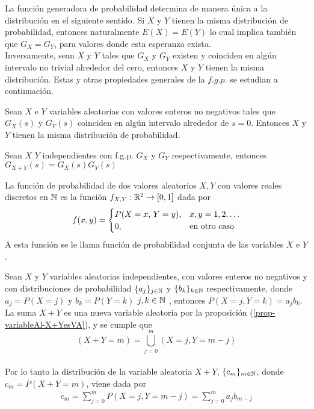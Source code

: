 La función generadora de probabilidad determina de manera única a la distribución en el siguiente sentido. Si $X$ y $Y$ tienen la misma distribución de probabilidad, entonces naturalmente $E(X)=E(Y)$ lo cual implica también que $G_X=G_Y$, para valores donde esta esperanza exista.\\
Inversamente, sean $X$ y $Y$ tales que $G_X$ y
$G_Y$ existen y coinciden en algún intervalo no trivial alrededor del cero,
entonces $X$ y $Y$ tienen la misma distribución. Estas y otras propiedades
generales de la $f.g.p.$ se estudian a continuación.
\begin{Prop}
    Sean $X$ e $Y$ variables aleatorias con valores enteros no negativos tales que $G_X(s)$ y $G_Y(s)$ coinciden en algún intervalo alrededor de $s=0$. Entonces $X$ y $Y$ tienen la misma distribución de probabilidad. \label{prop-funcionGenIgual-distribucuionIgual}
\end{Prop}
\begin{Prop}
    Sean $X$  $Y$ independientes con f.g.p. $G_X$ y $G_Y$ respectivamente, entonces $G_{X+Y}(s)=G_X(s)G_Y(s)$
    \label{prop-funcionGenSuma-productoFuncionGen}
\end{Prop}
\begin{Def} 
    La función de probabilidad de dos valores aleatorios $X, Y$ con valores reales discretos en ${\mathbb{N}}$ es la función $f_{X,Y} :{\mathbb{R}}^2 \rightarrow [0, 1]$ dada por
    $$f(x,y)=
    \begin{cases}
        P(X=x,\thinspace Y=y), & \mbox{$x,y=1,2,\ldots$}\\
        0,& \mbox{en otro caso}
    \end{cases}$$
    A esta función se le llama función de probabilidad conjunta de las variables $X$ e $Y$.
\end{Def}
Sean $X$ y $Y$ variables aleatorias independientes, con valores enteros no negativos y con distribuciones de probabilidad $\{a_j\}_{j\in{\mathbb{N}}}$ y $\{b_k\}_{k\in{\mathbb{N}}}$ respectivamente, donde $a_j=P(X=j)$ y  $b_k=P(Y=k)$ $j,k\in{\mathbb{N}}$ , entonces $P(X=j,Y=k)=a_j b_k$.\\ La suma $X+Y$ es una nueva variable aleatoria por la proposición (\ref{prop-variableAl-X+YesVA}), y se cumple que $$(X+Y=m)=\bigcup_{j=0}^{m}(X=j,Y=m-j)$$ \\ Por lo tanto la distribución de la variable aleatoria $X+Y$, $\{c_m\}_{m\in{\mathbb{N}}}$, donde $c_m=P(X+Y=m)$, viene dada por
\begin{eqnarray}
    c_m=\sum_{j=0}^m P(X=j,Y=m-j)=\sum_{j=0}^m a_j b_{m-j}\label{def-convolucion}
\end{eqnarray}
